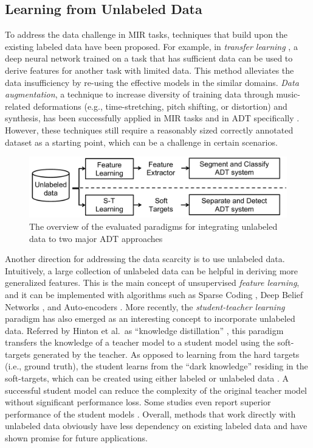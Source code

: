 \documentclass{article}
\begin{document}
\subsection{Learning from Unlabeled Data}
\label{subsec:learnFromUnlabeledData}
To address the data challenge in MIR tasks, techniques that build upon the existing labeled data have been proposed. For example, in \textit{transfer learning} \cite{Choi2017a}, a deep neural network trained on a task that has sufficient data can be used to derive features for another task with limited data. This method alleviates the data insufficiency by re-using the effective models in the similar domains. \textit{Data augmentation}, a technique to increase diversity of training data through music-related deformations (e.g., time-stretching, pitch shifting, or distortion) and synthesis, has been successfully applied in MIR tasks \cite{Mcfee2015} and in ADT specifically \cite{Wu2016, Vogl2017_icassp}. However, these techniques still require a reasonably sized correctly annotated dataset as a starting point, which can be a challenge in certain scenarios. 
\begin{figure}
\centering
\includegraphics[width = \columnwidth]{./figs/paradigms_overview.pdf}
\caption{The overview of the evaluated paradigms for integrating unlabeled data to two major ADT approaches}
\label{fig:overview}
\end{figure}

Another direction for addressing the data scarcity is to use unlabeled data. Intuitively, a large collection of unlabeled data can be helpful in deriving more generalized features. This is the main concept of unsupervised \textit{feature learning}, and it can be implemented with algorithms such as Sparse Coding \cite{Raina2007a}, Deep Belief Networks \cite{Hamel2010}, and Auto-encoders \cite{Masci2011}. More recently, the \textit{student-teacher learning} paradigm has also emerged as an interesting concept to incorporate unlabeled data. Referred by Hinton et al.~as ``knowledge distillation'' \cite{Hinton2015}, this paradigm transfers the knowledge of a teacher model to a student model using the soft-targets generated by the teacher. As opposed to learning from the hard targets (i.e., ground truth), the student learns from the ``dark knowledge'' residing in the soft-targets, which can be created using either labeled or unlabeled data \cite{Li2014}. A successful student model can reduce the complexity of the original teacher model without significant performance loss. Some studies even report superior performance of the student models \cite{Cui2017,Watanabe2017, Wu2017}. Overall, methods that work directly with unlabeled data obviously have less dependency on existing labeled data and have shown promise for future applications. 
\end{document}
